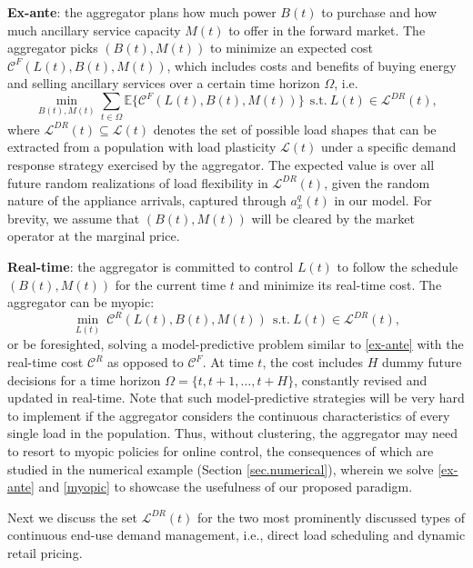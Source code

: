 \documentclass[10pt]{IEEEtran}
\begin{document}
{\bf Ex-ante}: the aggregator plans how much power $B(t)$ to purchase and how much ancillary service  capacity $M(t)$ to offer in the forward market. The aggregator picks $(B(t),M(t))$  to minimize an expected cost ${\mathcal C}^{F}(L(t),B(t),M(t))$, which includes costs and benefits of buying energy and selling ancillary services over a certain time horizon $\Omega$, i.e. 
\begin{equation}\label{ex-ante}
\min_{B(t),M(t)} \sum_{t\in \Omega}{\mathbb E}\{{\mathcal C}^{F}(L(t),B(t),M(t))\}~~\mbox{s.t.}~ L(t)\in { \mathcal L}^{DR}(t),
\end{equation}
where ${\mathcal L}^{DR}(t) \subseteq {\mathcal L}(t)$ denotes the set of possible load shapes that can be extracted from a population with load plasticity ${\mathcal L}(t)$ under a specific demand response strategy exercised by the aggregator. The expected value is over all future random realizations of load flexibility in ${ \mathcal L}^{DR}(t) $, given the random nature of the appliance arrivals, captured through $a^q_x(t)$ in our model. For brevity, we assume that $(B(t),M(t))$ will be cleared by the market operator at the marginal price.

{\bf Real-time}: the aggregator  is committed to control $L(t)$ to follow the schedule $(B(t),M(t))$ for the current time $t$ 
and minimize its real-time cost. The aggregator can be myopic:
\begin{equation}\label{myopic}
\min_{L(t)} ~{\mathcal C}^R(L(t),B(t),M(t))~~\mbox{s.t.}~ L(t)\in { \mathcal L}^{DR}(t),
\end{equation}
or be foresighted, solving a model-predictive problem similar to \eqref{ex-ante} with the real-time cost ${\mathcal C}^R$ as opposed to ${\mathcal C}^{F}$. At time $t$, the cost includes $H$ dummy future decisions for a time horizon $\Omega=\{t,t+1,\ldots,t+H\}$, constantly revised and updated in real-time. 
Note that such model-predictive strategies will be very hard to implement if the aggregator considers the continuous characteristics of every single load in the population. Thus, without clustering, the aggregator may need to resort to myopic policies for online control, the consequences of which are studied in the numerical example (Section \ref{sec.numerical}), wherein we solve \eqref{ex-ante} and \eqref{myopic}  to showcase the usefulness of our proposed paradigm.


Next we discuss the set ${ \mathcal L}^{DR}(t)$ for the two most prominently discussed types of continuous end-use demand management, i.e., direct load scheduling and dynamic retail pricing.
\end{document}
